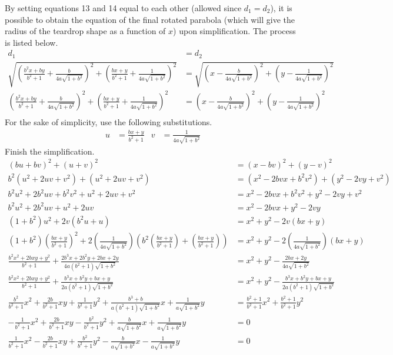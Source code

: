 \documentclass{article}
\begin{document}
By setting equations 13 and 14 equal to each other (allowed since $d_1=d_2$), it is possible to obtain the equation of the final rotated parabola (which will give the radius of the teardrop shape as a function of $x$) upon simplification. The process is listed below.
\begin{align*}
d_1 &= d_2\\
\sqrt{\left(\frac{b^2x+by}{b^2+1}+\frac{b}{4a\sqrt{1+b^2}}\right)^2+\left(\frac{bx+y}{b^2+1}+\frac{1}{4a\sqrt{1+b^2}}\right)^2} &= \sqrt{\left(x-\frac{b}{4a\sqrt{1+b^2}}\right)^2+\left(y-\frac{1}{4a\sqrt{1+b^2}}\right)^2}\\
\left(\frac{b^2x+by}{b^2+1}+\frac{b}{4a\sqrt{1+b^2}}\right)^2+\left(\frac{bx+y}{b^2+1}+\frac{1}{4a\sqrt{1+b^2}}\right)^2 &= \left(x-\frac{b}{4a\sqrt{1+b^2}}\right)^2+\left(y-\frac{1}{4a\sqrt{1+b^2}}\right)^2\\
\end{align*}
For the sake of simplicity, use the following substitutions.
\begin{align*}
u &= \frac{bx+y}{b^2+1} &
v &= \frac{1}{4a\sqrt{1+b^2}}
\end{align*}
Finish the simplification.
\begin{align*}
(bu+bv)^2+(u+v)^2 &= (x-bv)^2+(y-v)^2\\
b^2(u^2+2uv+v^2)+(u^2+2uv+v^2) &= (x^2-2bvx+b^2v^2)+(y^2-2vy+v^2)\\
b^2u^2+2b^2uv+b^2v^2+u^2+2uv+v^2 &= x^2-2bvx+b^2v^2+y^2-2vy+v^2\\
b^2u^2+2b^2uv+u^2+2uv &= x^2-2bvx+y^2-2vy\\
(1+b^2)u^2+2v(b^2u+u) &= x^2+y^2-2v(bx+y)\\
(1+b^2)\left(\frac{bx+y}{b^2+1}\right)^2+2\left(\frac{1}{4a\sqrt{1+b^2}}\right)\left(b^2\left(\frac{bx+y}{b^2+1}\right)+\left(\frac{bx+y}{b^2+1}\right)\right) &= x^2+y^2-2\left(\frac{1}{4a\sqrt{1+b^2}}\right)(bx+y)\\
\frac{b^2x^2+2bxy+y^2}{b^2+1}+\frac{2b^3x+2b^2y+2bx+2y}{4a(b^2+1)\sqrt{1+b^2}} &= x^2+y^2-\frac{2bx+2y}{4a\sqrt{1+b^2}}\\
\frac{b^2x^2+2bxy+y^2}{b^2+1}+\frac{b^3x+b^2y+bx+y}{2a(b^2+1)\sqrt{1+b^2}} &= x^2+y^2-\frac{b^3x+b^2y+bx+y}{2a(b^2+1)\sqrt{1+b^2}}\\
\frac{b^2}{b^2+1}x^2+\frac{2b}{b^2+1}xy+\frac{1}{b^2+1}y^2+\frac{b^3+b}{a(b^2+1)\sqrt{1+b^2}}x+\frac{1}{a\sqrt{1+b^2}}y &= \frac{b^2+1}{b^2+1}x^2+\frac{b^2+1}{b^2+1}y^2\\
-\frac{1}{b^2+1}x^2+\frac{2b}{b^2+1}xy-\frac{b^2}{b^2+1}y^2+\frac{b}{a\sqrt{1+b^2}}x+\frac{1}{a\sqrt{1+b^2}}y &= 0\\
\frac{1}{b^2+1}x^2-\frac{2b}{b^2+1}xy+\frac{b^2}{b^2+1}y^2-\frac{b}{a\sqrt{1+b^2}}x-\frac{1}{a\sqrt{1+b^2}}y &= 0\tag{15}
\end{align*}
\end{document}
